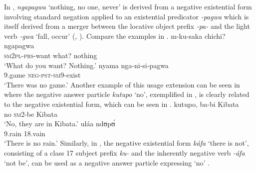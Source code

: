 \documentclass[output=paper]{langscibook}
\begin{document}
In , \textit{ngapagwa} `nothing, no one, never' is derived from a
negative existential form involving standard negation applied to an
existential predicator \textit{-pagwa} which is itself derived from a
merger between the locative object prefix \textit{-pa-} and the light verb
\textit{-gwa} `fall, occur' (\citealt[72]{Sanderson1922},
\citealt[174]{Whiteley1966}). Compare the examples in
.
%
\ea\label{ex:yao-want-game} 
\ea\gll m-ku-saka chichi? ngapagwa\\
\textsc{sm2pl-prs}-want what? nothing\\ \glt 	`What do you want?
Nothing.' \ex\gll nyama nga-ni-si-pagwa\\ 9.game
\textsc{neg-pst-sm}9-exist\\ \glt 	`There was no game.' \z\z 
%
Another
example of this usage extension can be seen in  where the
negative answer particle \textit{kutupo} `no', exemplified in
, is clearly related to the negative existential
form, which can be seen in .
\ea\label{ex:matumbi-kibata-rain} 
\ea\label{ex:matumbi-kibata} \gll kutupo, ba-bi Kibata\\ no \textsc{sm}2-be
Kibata\\ \glt 	`No, they are in Kibata.' \ex\label{ex:matumbi-rain} \gll
ul{\'a}a ndʊp{\'ʊ}\\ 9.rain 18.vain\\ \glt 	`There is no rain.' \z\z
Similarly, in , the negative existential form \textit{k{\'a}fa}
`there is not', consisting of a class 17 subject prefix \textit{ku-} and
the inherently negative verb \textit{-áfa} `not be', can be used as a negative
answer particle expressing `no' \citep[30]{Meeussen1952}.
\end{document}
